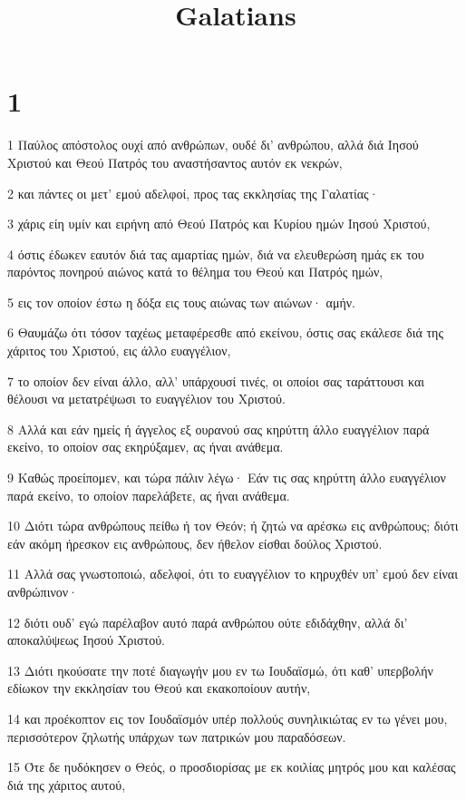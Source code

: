 

\title{Galatians}


\chapter{1}

\par 1 Παύλος απόστολος ουχί από ανθρώπων, ουδέ δι' ανθρώπου, αλλά διά Ιησού Χριστού και Θεού Πατρός του αναστήσαντος αυτόν εκ νεκρών,
\par 2 και πάντες οι μετ' εμού αδελφοί, προς τας εκκλησίας της Γαλατίας·
\par 3 χάρις είη υμίν και ειρήνη από Θεού Πατρός και Κυρίου ημών Ιησού Χριστού,
\par 4 όστις έδωκεν εαυτόν διά τας αμαρτίας ημών, διά να ελευθερώση ημάς εκ του παρόντος πονηρού αιώνος κατά το θέλημα του Θεού και Πατρός ημών,
\par 5 εις τον οποίον έστω η δόξα εις τους αιώνας των αιώνων· αμήν.
\par 6 Θαυμάζω ότι τόσον ταχέως μεταφέρεσθε από εκείνου, όστις σας εκάλεσε διά της χάριτος του Χριστού, εις άλλο ευαγγέλιον,
\par 7 το οποίον δεν είναι άλλο, αλλ' υπάρχουσί τινές, οι οποίοι σας ταράττουσι και θέλουσι να μετατρέψωσι το ευαγγέλιον του Χριστού.
\par 8 Αλλά και εάν ημείς ή άγγελος εξ ουρανού σας κηρύττη άλλο ευαγγέλιον παρά εκείνο, το οποίον σας εκηρύξαμεν, ας ήναι ανάθεμα.
\par 9 Καθώς προείπομεν, και τώρα πάλιν λέγω· Εάν τις σας κηρύττη άλλο ευαγγέλιον παρά εκείνο, το οποίον παρελάβετε, ας ήναι ανάθεμα.
\par 10 Διότι τώρα ανθρώπους πείθω ή τον Θεόν; ή ζητώ να αρέσκω εις ανθρώπους; διότι εάν ακόμη ήρεσκον εις ανθρώπους, δεν ήθελον είσθαι δούλος Χριστού.
\par 11 Αλλά σας γνωστοποιώ, αδελφοί, ότι το ευαγγέλιον το κηρυχθέν υπ' εμού δεν είναι ανθρώπινον·
\par 12 διότι ουδ' εγώ παρέλαβον αυτό παρά ανθρώπου ούτε εδιδάχθην, αλλά δι' αποκαλύψεως Ιησού Χριστού.
\par 13 Διότι ηκούσατε την ποτέ διαγωγήν μου εν τω Ιουδαϊσμώ, ότι καθ' υπερβολήν εδίωκον την εκκλησίαν του Θεού και εκακοποίουν αυτήν,
\par 14 και προέκοπτον εις τον Ιουδαϊσμόν υπέρ πολλούς συνηλικιώτας εν τω γένει μου, περισσότερον ζηλωτής υπάρχων των πατρικών μου παραδόσεων.
\par 15 Ότε δε ηυδόκησεν ο Θεός, ο προσδιορίσας με εκ κοιλίας μητρός μου και καλέσας διά της χάριτος αυτού,
